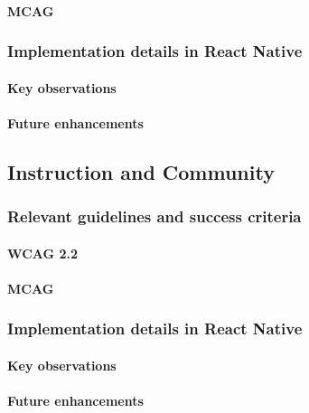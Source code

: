 \paragraph{MCAG}

\subsubsection{Implementation details in React Native}

\paragraph{Key observations}

\paragraph{Future enhancements}

\subsection{Instruction and Community}

\subsubsection{Relevant guidelines and success criteria}

\paragraph{WCAG 2.2}

\paragraph{MCAG}

\subsubsection{Implementation details in React Native}

\paragraph{Key observations}

\paragraph{Future enhancements}


\newpage

